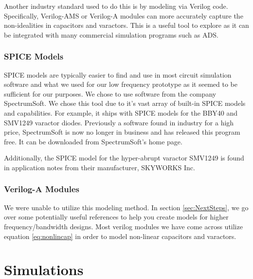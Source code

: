 \documentclass[journal]{IEEEtran}
\begin{document}
    Another industry standard used to do this is by modeling via Verilog code. Specifically, Verilog-AMS or Verilog-A modules can more accurately capture the non-idealities in capacitors and varactors. This is a useful tool to explore as it can be integrated with many commercial simulation programs such as ADS.
    
\subsubsection{SPICE Models}

SPICE models are typically easier to find and use in most circuit simulation software and what we used for our low frequency prototype as it seemed to be sufficient for our purposes. We chose to use software from the company SpectrumSoft. We chose this tool due to it's vast array of built-in SPICE models and capabilities. For example, it ships with SPICE models for the BBY40 and SMV1249 varactor diodes. Previously a software found in industry for a high price, SpectrumSoft is now no longer in business and has released this program free. It can be downloaded from SpectrumSoft's home page.  


Additionally, the SPICE model for the hyper-abrupt varactor SMV1249 is found in application notes from their manufacturer, SKYWORKS Inc.




\subsubsection{Verilog-A Modules}

We were unable to utilize this modeling method. In section \ref{sec:NextSteps},  we go over some potentially useful references to help you create models for higher frequency/bandwidth designs. Most verilog modules we have come across utilize equation \ref{eq:nonlincap} in order to model non-linear capacitors and varactors. 








\section{ Simulations }
\end{document}

